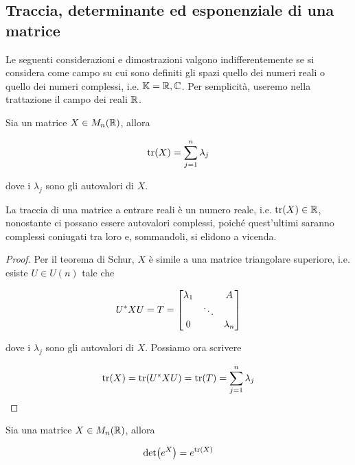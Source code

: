 \subsection{Traccia, determinante ed esponenziale di una matrice}

Le seguenti considerazioni e dimostrazioni valgono indifferentemente se si considera come campo su cui sono definiti gli spazi quello dei numeri reali o quello dei numeri complessi, i.e. $ \mathbb{K} = \mathbb{R},\mathbb{C} $. Per semplicità, useremo nella trattazione il campo dei reali $ \mathbb{R} $.

\begin{definition}
	Sia un matrice $ X \in M_{n}(\mathbb{R}) $, allora
	
	\begin{equation}
		\tr(X) = \sum_{j=1}^{n} \lambda_{j}
	\end{equation}
	
	dove i $ \lambda_{j} $ sono gli autovalori di $ X $.
\end{definition}

La traccia di una matrice a entrare reali è un numero reale, i.e. $ \tr(X) \in \mathbb{R} $, nonostante ci possano essere autovalori complessi, poiché quest'ultimi saranno complessi coniugati tra loro e, sommandoli, si elidono a vicenda.

\begin{proof}
	Per il teorema di Schur, $ X $ è simile a una matrice triangolare superiore, i.e. esiste $ U \in U(n) $ tale che
	
	\begin{equation}
		U^{*} X U = T = %
		\bmqty{ %
				\lambda_{1}	& & A \\
				& \ddots & \\
				0 & & \lambda_{n} %
				}
	\end{equation}
	
	dove i $ \lambda_{j} $ sono gli autovalori di $ X $. Possiamo ora scrivere
	
	\begin{equation}
		\tr(X) = \tr(U^{*} X U) %
		= \tr(T) %
		= \sum_{j=1}^{n} \lambda_{j}
	\end{equation}
\end{proof}

\begin{definition}\label{prop:det-exp-tr}
	Sia una matrice $ X \in M_{n}(\mathbb{R}) $, allora
	
	\begin{equation}
		\det(e^{X}) = e^{\tr(X)}
	\end{equation}
\end{definition}

